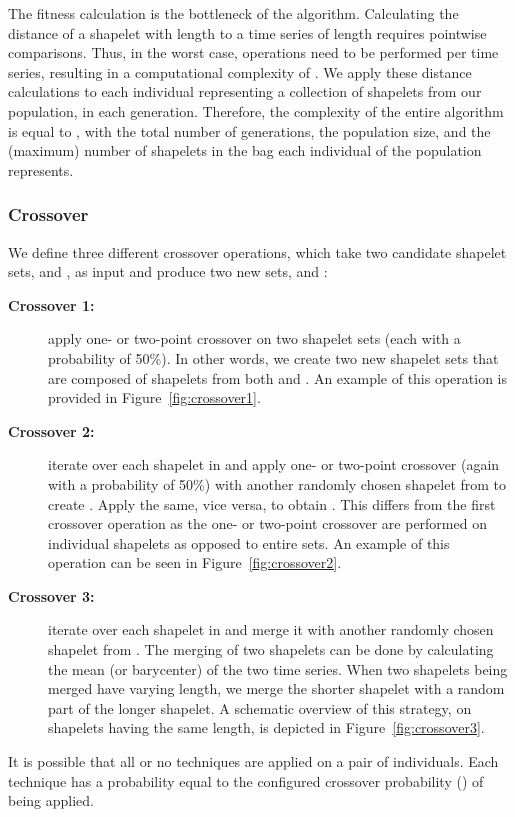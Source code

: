 \documentclass[runningheads]{llncs}
\begin{document}
The fitness calculation is the bottleneck of the algorithm. Calculating the distance of a shapelet with length  to a time series of length  requires  pointwise comparisons. Thus, in the worst case,  operations need to be performed per time series, resulting in a computational complexity of . We apply these distance calculations to each individual representing a collection of shapelets from our population, in each generation. Therefore, the complexity of the entire algorithm is equal to , with  the total number of generations,  the population size, and  the (maximum) number of shapelets in the bag each individual of the population represents.

\subsubsection{Crossover}\label{subsubsec:crossover}

We define three different crossover operations, which take two candidate shapelet sets,  and , as input and produce two new sets,  and :
\begin{description}
	\item [\textbf{Crossover 1:}] apply one- or two-point crossover on two shapelet sets (each with a probability of 50\%). In other words, we create two new shapelet sets that are composed of shapelets from both  and . An example of this operation is provided in Figure~\ref{fig:crossover1}.
	\item [\textbf{Crossover 2:}] iterate over each shapelet  in  and apply one- or two-point crossover (again with a probability of 50\%) with another randomly chosen shapelet from  to create . Apply the same, vice versa, to obtain . This differs from the first crossover operation as the one- or two-point crossover are performed on individual shapelets as opposed to entire sets. An example of this operation can be seen in Figure~\ref{fig:crossover2}.
	\item [\textbf{Crossover 3:}] iterate over each shapelet  in  and merge it with another randomly chosen shapelet from . The merging of two shapelets can be done by calculating the mean (or barycenter) of the two time series. When two shapelets being merged have varying length, we merge the shorter shapelet with a random part of the longer shapelet.  A schematic overview of this strategy, on shapelets having the same length, is depicted in Figure~\ref{fig:crossover3}.
	
\end{description}
It is possible that all or no techniques are applied on a pair of individuals. Each technique has a probability equal to the configured crossover probability () of being applied.
\end{document}
